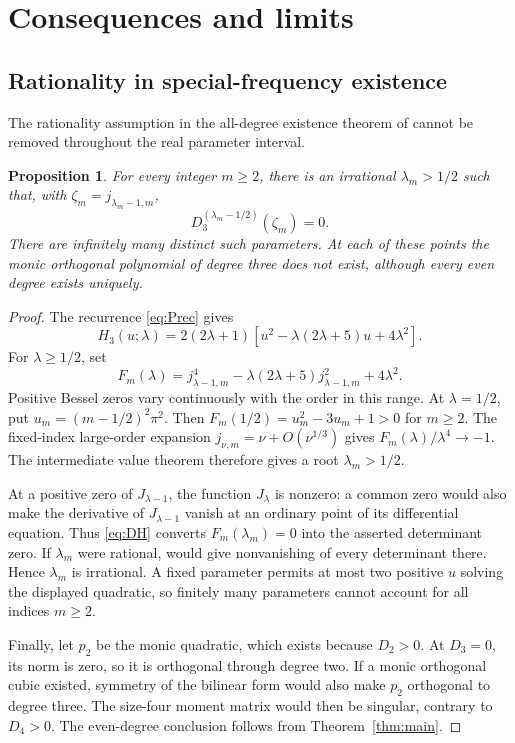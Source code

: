 \documentclass[11pt]{article}
\numberwithin{equation}{section}
\newtheorem{proposition}[theorem]{Proposition}
\theoremstyle{remark}
\begin{document}
\section{Consequences and limits}\label{sec:consequences}

\subsection{Rationality in special-frequency existence}

The rationality assumption in the all-degree existence theorem of
\cite[Theorem~2.2]{MCM2008} cannot be removed throughout the real
parameter interval.

\begin{proposition}\label{prop:irrational}
For every integer $m\ge2$, there is an irrational $\lambda_m>1/2$ such
that, with $\zeta_m=j_{\lambda_m-1,m}$,
\[
                   D_3^{(\lambda_m-1/2)}(\zeta_m)=0.
\]
There are infinitely many distinct such parameters. At each of these
points the monic orthogonal polynomial of degree three does not exist,
although every even degree exists uniquely.
\end{proposition}

\begin{proof}
The recurrence \eqref{eq:Prec} gives
\[
 H_3(u;\lambda)=2(2\lambda+1)
        [u^2-\lambda(2\lambda+5)u+4\lambda^2].
\]
For $\lambda\ge1/2$, set
\[
 F_m(\lambda)=j_{\lambda-1,m}^4
 -\lambda(2\lambda+5)j_{\lambda-1,m}^2+4\lambda^2.
\]
Positive Bessel zeros vary continuously with the order in this range.
At $\lambda=1/2$, put $u_m=(m-1/2)^2\pi^2$. Then
$F_m(1/2)=u_m^2-3u_m+1>0$ for $m\ge2$. The fixed-index large-order
expansion $j_{\nu,m}=\nu+O(\nu^{1/3})$
\cite[\S10.21, Eq.~10.21.32]{DLMF} gives
$F_m(\lambda)/\lambda^4\to-1$. The intermediate value theorem
therefore gives a root $\lambda_m>1/2$.

At a positive zero of $J_{\lambda-1}$, the function $J_\lambda$ is
nonzero: a common zero would also make the derivative of
$J_{\lambda-1}$ vanish at an ordinary point of its differential
equation. Thus \eqref{eq:DH} converts $F_m(\lambda_m)=0$ into the
asserted determinant zero. If $\lambda_m$ were rational,
\cite[Theorem~2.2]{MCM2008} would give nonvanishing of every
determinant there. Hence $\lambda_m$ is irrational. A fixed parameter
permits at most two positive $u$ solving the displayed quadratic, so
finitely many parameters cannot account for all indices $m\ge2$.

Finally, let $p_2$ be the monic quadratic, which exists because
$D_2>0$. At $D_3=0$, its norm is zero, so it is orthogonal through
degree two. If a monic orthogonal cubic existed, symmetry of the
bilinear form would also make $p_2$ orthogonal to degree three. The
size-four moment matrix would then be singular, contrary to $D_4>0$.
The even-degree conclusion follows from Theorem~\ref{thm:main}.
\end{proof}
\end{document}
